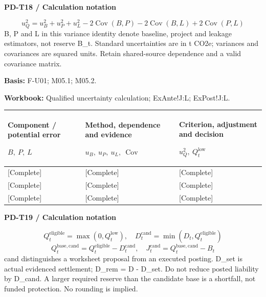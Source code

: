\textbf{PD-T18 / Calculation notation}\par
{\fontsize{9}{11}\selectfont\[ u_Q^2=u_B^2+u_P^2+u_L^2-2\operatorname{Cov}(B,P)-2\operatorname{Cov}(B,L)+2\operatorname{Cov}(P,L) \]}
B, P and L in this variance identity denote baseline, project and leakage estimators, not reserve B\_t. Standard uncertainties are in t CO2e; variances and covariances are squared units. Retain shared-source dependence and a valid covariance matrix.\par
\textbf{Basis:} F-U01; M05.1; M05.2.\par
\textbf{Workbook:} Qualified uncertainty calculation; ExAnte!J:L; ExPost!J:L.\par\endgroup
{\sffamily\fontsize{8.3}{10.3}\selectfont\begin{longtable}{@{}P{52.79mm} P{59.39mm} P{52.79mm}@{}}
\toprule
\textbf{Component / potential error}\par {\normalfont\fontsize{8.2}{10}\selectfont $B,\ P,\ L$} & \textbf{Method, dependence and evidence}\par {\normalfont\fontsize{8.2}{10}\selectfont $u_B,\ u_P,\ u_L,\ \operatorname{Cov}$} & \textbf{Criterion, adjustment and decision}\par {\normalfont\fontsize{8.2}{10}\selectfont $u_Q^2,\ Q_t^{\mathrm{low}}$}\\\midrule\endhead
\rule{0pt}{7.7mm}[Complete] & [Complete] & [Complete]\\\hline
\rule{0pt}{7.7mm}[Complete] & [Complete] & [Complete]\\\hline
\rule{0pt}{7.7mm}[Complete] & [Complete] & [Complete]\\\hline
\end{longtable}}
\par\begingroup\sffamily\fontsize{8}{10}\selectfont\color{NEBGreen}\setlength{\parskip}{2pt}\setlength{\abovedisplayskip}{4pt}\setlength{\belowdisplayskip}{4pt}\setlength{\abovedisplayshortskip}{2pt}\setlength{\belowdisplayshortskip}{3pt}
\textbf{PD-T19 / Calculation notation}\par
{\fontsize{9}{11}\selectfont\[ Q_t^{\mathrm{eligible}}=\max(0,Q_t^{\mathrm{low}}),\quad D_t^{\mathrm{cand}}=\min(D_t,Q_t^{\mathrm{eligible}}) \]}
{\fontsize{9}{11}\selectfont\[ Q_t^{\mathrm{base,cand}}=Q_t^{\mathrm{eligible}}-D_t^{\mathrm{cand}},\quad J_t^{\mathrm{cand}}=Q_t^{\mathrm{base,cand}}-B_t \]}
cand distinguishes a worksheet proposal from an executed posting. D\_set is actual evidenced settlement; D\_rem = D - D\_set. Do not reduce posted liability by D\_cand. A larger required reserve than the candidate base is a shortfall, not funded protection. No rounding is implied.\par
